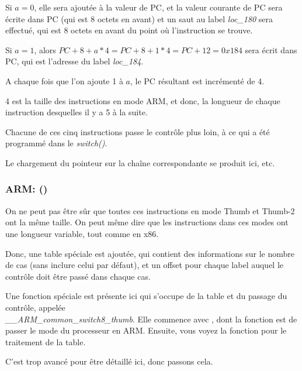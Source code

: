 Si $a=0$, elle sera ajoutée à la valeur de \ac{PC}, et la valeur courante de \ac{PC}
sera écrite dans \ac{PC} (qui est 8 octets en avant) et un saut au label \emph{loc\_180}
sera effectué, qui est 8 octets en avant du point où l'instruction se trouve.

Si $a=1$, alors $PC+8+a*4 = PC+8+1*4 = PC+12 = 0x184$ sera écrit dans \ac{PC}, qui
est l'adresse du label \emph{loc\_184}.

A chaque fois que l'on ajoute 1 à $a$, le \ac{PC} résultant est incrémenté de
4.

4 est la taille des instructions en mode ARM, et donc, la longueur de chaque instruction
 desquelles il y a 5 à la suite.

Chacune de ces cinq instructions  passe le contrôle plus loin, à ce qui a
été programmé dans le \emph{switch()}.

Le chargement du pointeur sur la chaîne correspondante se produit ici, etc.

\subsubsection{ARM: \OptimizingKeilVI (\ThumbMode)}




On ne peut pas être sûr que toutes ces instructions en mode Thumb et Thumb-2 ont
la même taille. On peut même dire que les instructions dans ces modes ont une longueur
variable, tout comme en x86.


Donc, une table spéciale est ajoutée, qui contient des informations sur le nombre
de cas (sans inclure celui par défaut), et un offset pour chaque label auquel le
contrôle doit être passé dans chaque cas.


Une fonction spéciale est présente ici qui s'occupe de la table et du passage du
contrôle, appelée\\ \emph{\_\_ARM\_common\_switch8\_thumb}.
Elle commence avec , dont la fonction est de passer le mode du processeur
en ARM.
Ensuite, vous voyez la fonction pour le traitement de la table.

C'est trop avancé pour être détaillé ici, donc passons cela.

